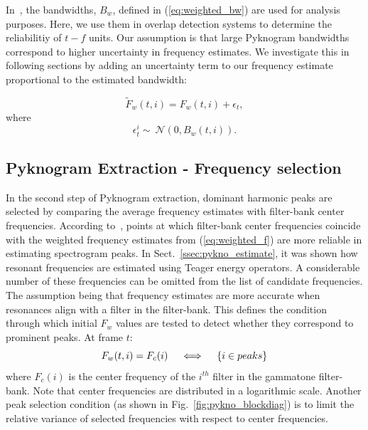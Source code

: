 {In~\cite{potamianos_maragos_jasa96}, the bandwidths, $B_w$, defined in (\ref{eq:weighted_bw}) are used for analysis purposes. 
Here, we use them in overlap detection systems to determine the reliabilitiy of $t-f$ units. 
Our assumption is that large Pyknogram bandwidths correspond to higher uncertainty in frequency estimates. 
We investigate this in following sections by adding an uncertainty term to our frequency estimate proportional to the estimated bandwidth:



\begin{equation}
\label{eq:jitter_f}
\tilde F_w(t,i) = F_w(t,i) + \epsilon_t,
\end{equation}
where
\begin{equation}
\label{eq:jitter_pdf}
\epsilon^i_t \sim\ \mathcal{N}(0,B_w(t,i)).
\end{equation}

\subsection{Pyknogram Extraction - Frequency selection}
\label{sssec:pykno_select}
In the second step of Pyknogram extraction, dominant harmonic peaks are selected by comparing the average frequency estimates with filter-bank center frequencies. 
According to~\cite{potamianos_maragos_jasa96}, points at which filter-bank center frequencies coincide with the weighted frequency estimates from (\ref{eq:weighted_f}) are more reliable in estimating spectrogram peaks. 
In Sect.~\ref{ssec:pykno_estimate}, it was shown how resonant frequencies are estimated using Teager energy operators. 
A considerable number of these frequencies can be omitted from the list of candidate frequencies. 
The assumption being that frequency estimates are more accurate when resonances align with a filter in the filter-bank. 
This defines the condition through which initial $F_w$ values are tested to detect whether they correspond to prominent peaks. At frame $t$: 
\vspace{0mm}
\begin{equation}
\label{eq:RF1}
F_w(t,i) = F_c(i)  \quad \iff \quad \{i \in peaks\}
\vspace{1mm}
\end{equation}
where $F_c(i)$ is the center frequency of the $i^{th}$ filter in the gammatone filter-bank. 
Note that center frequencies are distributed in a logarithmic scale. 
Another peak selection condition (as shown in Fig.~\ref{fig:pykno_blockdiag}) is to limit the relative variance of selected frequencies with respect to center frequencies. 

}
